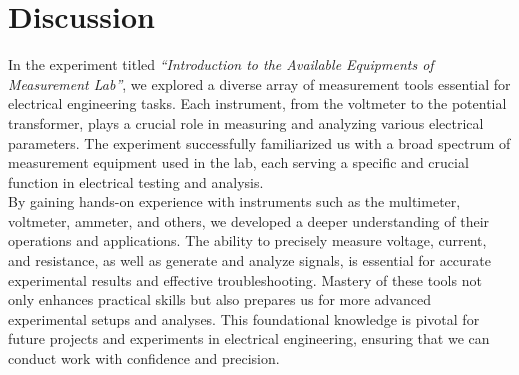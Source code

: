 \documentclass[a4paper,12pt]{article}
\begin{document}
	\section{Discussion}

	
	In the experiment titled \textit{“Introduction to the Available Equipments of Measurement Lab”}, we explored a diverse array of measurement tools essential for electrical engineering tasks. Each instrument, from the voltmeter to the potential transformer, plays a crucial role in measuring and analyzing various electrical parameters. The experiment successfully familiarized us with a broad spectrum of measurement equipment used in the lab, each serving a specific and crucial function in electrical testing and analysis.\\
	By gaining hands-on experience with instruments such as the multimeter, voltmeter, ammeter, and others, we developed a deeper understanding of their operations and applications. The ability to precisely measure voltage, current, and resistance, as well as generate and analyze signals, is essential for accurate experimental results and effective troubleshooting. Mastery of these tools not only enhances practical skills but also prepares us for more advanced experimental setups and analyses. This foundational knowledge is pivotal for future projects and experiments in electrical engineering, ensuring that we can conduct work with confidence and precision.
	
	
\end{document}
